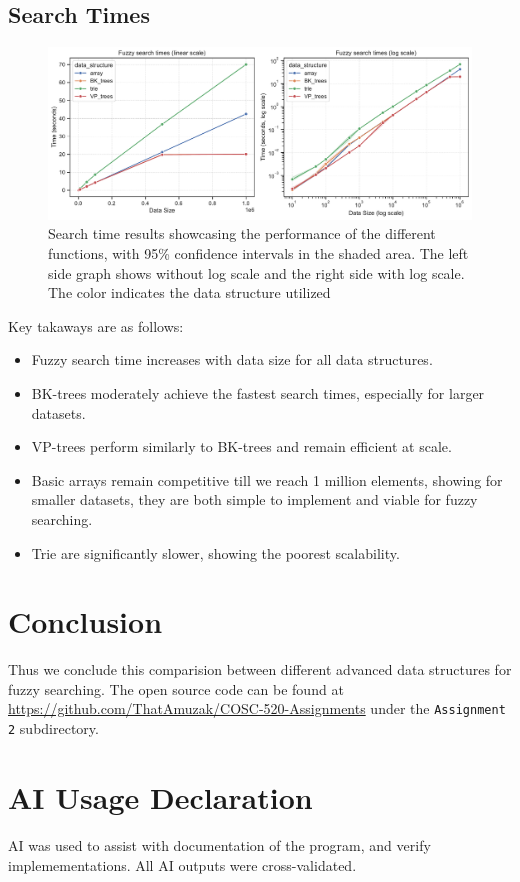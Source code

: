 \documentclass[acmsmall,screen, nonacm]{acmart}
\begin{document}
\subsection{Search Times}

\begin{figure}[H]
	\centering
	\includegraphics[width=1\textwidth]{search_times.pdf}
	\caption{Search time results showcasing the performance of the different functions, with 95\% confidence intervals in the shaded area. The left side graph shows without log scale and the right side with log scale. The color indicates the data structure utilized}
	\label{fig:pdfimage2}
\end{figure}

Key takaways are as follows:
\begin{itemize}
	\item Fuzzy search time increases with data size for all data structures.
	\item BK-trees moderately achieve the fastest search times, especially for larger datasets.
	\item VP-trees perform similarly to BK-trees and remain efficient at scale.
	\item Basic arrays remain competitive till we reach 1 million elements, showing for smaller datasets, they are both simple to implement and viable for fuzzy searching.
	\item Trie are significantly slower, showing the poorest scalability.
\end{itemize}

\section{Conclusion}
Thus we conclude this comparision between different advanced data structures for fuzzy searching. The open source code can be found at \url{https://github.com/ThatAmuzak/COSC-520-Assignments} under the \texttt{Assignment 2} subdirectory.

\section{AI Usage Declaration}
AI was used to assist with documentation of the program, and verify implemementations. All AI outputs were cross-validated.



\end{document}
